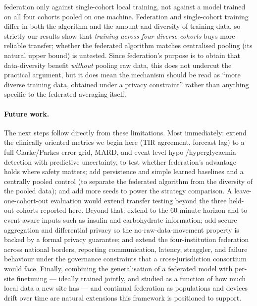 \documentclass[10pt,letterpaper]{article}
\begin{document}
federation only against single-cohort local training, not against a model trained
on all four cohorts pooled on one machine. Federation and single-cohort training
differ in both the algorithm and the amount and diversity of training data, so
strictly our results show that \emph{training across four diverse cohorts} buys
more reliable transfer; whether the federated algorithm matches centralised
pooling (its natural upper bound) is untested. Since federation's purpose is to
obtain that data-diversity benefit \emph{without} pooling raw data, this does not
undercut the practical argument, but it does mean the mechanism should be read as
``more diverse training data, obtained under a privacy constraint'' rather than
anything specific to the federated averaging itself.

\paragraph{Future work.} The next steps follow directly from these limitations.
Most immediately: extend the clinically oriented metrics we begin here (TIR
agreement, forecast lag) to a full Clarke/Parkes error grid, MARD, and event-level
hypo-/hyperglycaemia detection with predictive uncertainty, to test whether
federation's advantage holds where safety matters; add persistence and simple
learned baselines and a centrally pooled control (to separate the federated
algorithm from the diversity of the pooled data); and add more seeds to power the
strategy comparison. A leave-one-cohort-out evaluation would extend transfer
testing beyond the three held-out cohorts reported here. Beyond that: extend to the
60-minute horizon and to event-aware inputs such as insulin and carbohydrate
information; add secure aggregation and differential privacy so the
no-raw-data-movement property is backed by a formal privacy guarantee; and extend
the four-institution federation across national borders, reporting communication,
latency, straggler, and failure behaviour under the governance constraints that a
cross-jurisdiction consortium would face. Finally, combining the
generalisation of a federated model with per-site finetuning --- ideally trained
jointly, and studied as a function of how much local data a new site has --- and
continual federation as populations and devices drift over time are natural
extensions this framework is positioned to support.



\end{document}

